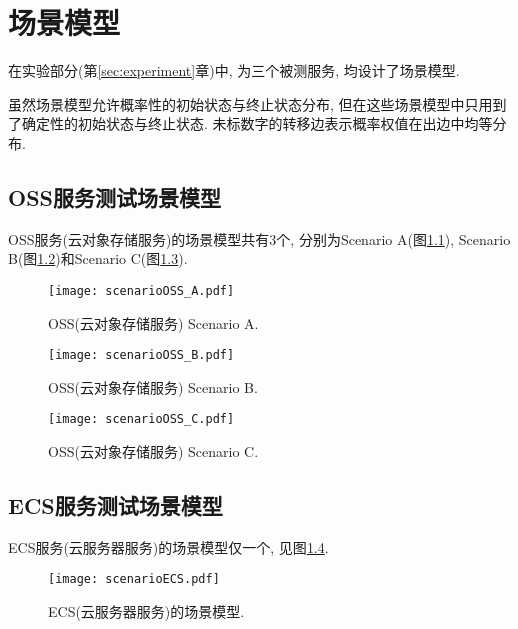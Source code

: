 \chapter{场景模型}

    在实验部分(第\ref{sec:experiment}章)中, 为三个被测服务, 均设计了场景模型.
    
    虽然场景模型允许概率性的初始状态与终止状态分布, 但在这些场景模型中只用到了确定性的初始状态与终止状态. 未标数字的转移边表示概率权值在出边中均等分布.
    
    \section{OSS服务测试场景模型}
        OSS服务(云对象存储服务)的场景模型共有3个, 分别为Scenario A(图\ref{fig:oss_scenario_A}), Scenario B(图\ref{fig:oss_scenario_B})和Scenario C(图\ref{fig:oss_scenario_C}).
        
        \begin{figure}[!htb]
            \centering
            \texttt{[image: scenarioOSS\_A.pdf]}
            \caption{OSS(云对象存储服务) Scenario A.}
            \label{fig:oss_scenario_A}
        \end{figure}
        
         \begin{figure}[!htb]
            \centering
            \texttt{[image: scenarioOSS\_B.pdf]}
            \caption{OSS(云对象存储服务) Scenario B.}
            \label{fig:oss_scenario_B}
        \end{figure}
        
         \begin{figure}[!htb]
            \centering
            \texttt{[image: scenarioOSS\_C.pdf]}
            \caption{OSS(云对象存储服务) Scenario C.}
            \label{fig:oss_scenario_C}
        \end{figure}
    
    \section{ECS服务测试场景模型}
        ECS服务(云服务器服务)的场景模型仅一个, 见图\ref{fig:ecs_scenario}.
        
        \begin{figure}[!htb]
            \centering
            \texttt{[image: scenarioECS.pdf]}
            \caption{ECS(云服务器服务)的场景模型.}
            \label{fig:ecs_scenario}
        \end{figure}
        
